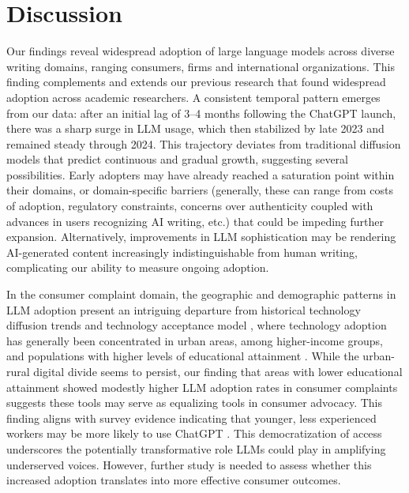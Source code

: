 

\section*{Discussion}


Our findings reveal widespread adoption of large language models across diverse writing domains, ranging consumers, firms and international organizations. This finding complements and extends our previous research that found widespread adoption across academic researchers.\cite{liang2024monitoring} 
A consistent temporal pattern emerges from our data: after an initial lag of 3–4 months following the ChatGPT launch, there was a sharp surge in LLM usage, which then stabilized by late 2023 and remained steady through 2024. This trajectory deviates from traditional diffusion models that predict continuous and gradual growth, suggesting several possibilities. Early adopters may have already reached a saturation point within their domains, or domain-specific barriers (generally, these can range from costs of adoption, regulatory constraints, concerns over authenticity coupled with advances in users recognizing AI writing, etc.) that could be impeding further expansion. Alternatively, improvements in LLM sophistication may be rendering AI-generated content increasingly indistinguishable from human writing, complicating our ability to measure ongoing adoption.


In the consumer complaint domain, the geographic and demographic patterns in LLM adoption present an intriguing departure from historical technology diffusion trends \cite{rogers2014diffusion, bloom2021diffusion, 10.1093/qje/qjaf002} and technology acceptance model \cite{davis1989technology, venkatesh2003user}, where technology adoption has generally been concentrated in urban areas, among higher-income groups, and populations with higher levels of educational attainment \cite{rojas2017demographics, foster2010microeconomics}. While the urban-rural digital divide seems to persist, our finding that areas with lower educational attainment showed modestly higher LLM adoption rates in consumer complaints suggests these tools may serve as equalizing tools in consumer advocacy. This finding aligns with  survey evidence indicating  that younger, less experienced workers may be more likely to use ChatGPT \cite{humlum2024chatgpt}. %
This democratization of access underscores the potentially transformative role LLMs could play in amplifying underserved voices. However, further study is needed to assess whether this increased adoption translates into more effective consumer outcomes. 


